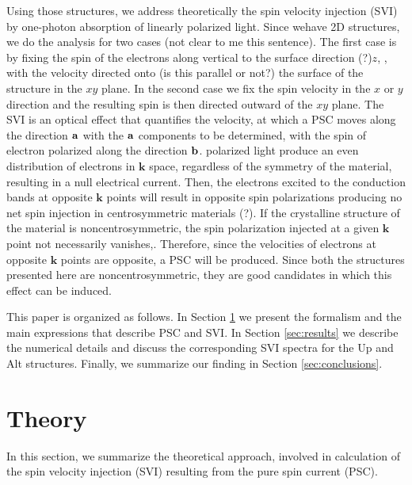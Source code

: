 \documentclass[floatfix,prb,aps,superscriptaddress,showpacs,11pt,preprint,letterpaper]{revtex4}
\begin{document}
Using those structures, we address theoretically the spin velocity injection
(SVI) by one-photon absorption of linearly polarized light. Since wehave 2D
structures, we do the analysis for two cases {\color{red}(not clear to me this
sentence)}. The first case is by fixing the spin of the electrons along
vertical to the surface direction {\color{red}(?)}$z$, , with the velocity
directed onto {\color{red}(is this parallel or not?)} the surface of the
structure in the $xy$ plane. In the second case we fix the spin velocity in the
$x$ or $y$ direction and the resulting spin is then directed outward of the
$xy$ plane. The SVI is an optical effect that quantifies the velocity, at which
a PSC moves along the direction $\bf{a}$ with the $\bf{a}$ components to be
determined, with the spin of electron polarized along the direction $\bf{b}$.
polarized light produce an even distribution of electrons in $\mathbf{k}$
space, regardless of the symmetry of the material, resulting in a null
electrical current.\cite{bhatPRL05} Then, the electrons excited to the
conduction bands at opposite $\mathbf{k}$ points will result in opposite spin
polarizations producing no net spin injection in centrosymmetric materials
{\color{red}(?)}.\cite{bhatPRL05} If the crystalline structure of the material
is noncentrosymmetric, the spin polarization injected at a given $\mathbf{k}$
point not necessarily vanishes,\cite{alvaradoPRL85, schmiedeskampPRL88}.
Therefore, since the velocities of electrons at opposite $\mathbf{k}$ points
are opposite, a PSC will be produced. Since both the structures presented here
are noncentrosymmetric, they are good candidates in which this effect can be
induced.

This paper is organized as follows. In Section \ref{sec:theory} we present the
formalism and the main expressions  that describe PSC and SVI. In Section
\ref{sec:results} we describe the numerical details  and  discuss the
corresponding SVI spectra for the Up and Alt structures. Finally, we summarize
our finding in Section \ref{sec:conclusions}.

\section{Theory}
\label{sec:theory}

In this section, we  summarize the theoretical approach, involved in
calculation of the spin velocity injection (SVI) resulting from the pure spin
current (PSC).
 
\end{document}
